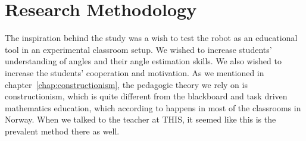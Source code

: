 \chapter{Research Methodology}
The inspiration behind the study was a wish to test the robot as an educational tool in an experimental classroom setup. We wished to increase students' understanding of angles and their angle estimation skills. We also wished to increase the students' cooperation and motivation. As we mentioned in chapter~\ref{chap:constructionism}, the pedagogic theory we rely on is constructionism, which is quite different from the blackboard and task driven mathematics education, which according to  happens in most of the classrooms in Norway. When we talked to the teacher at THIS, it seemed like this is the prevalent method there as well. 





